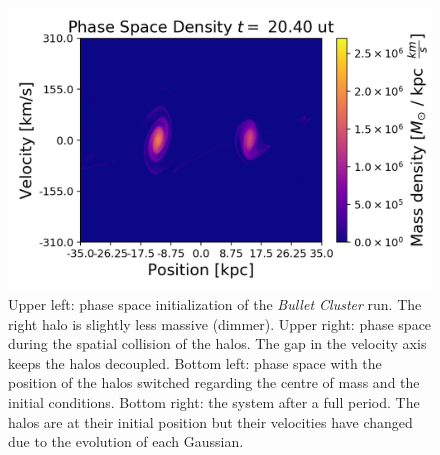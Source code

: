 \begin{figure}[h!]
    \includegraphics[scale=0.45]{imag/bullet51.png}
    \caption{Upper left: phase space initialization of the \emph{Bullet Cluster} run. The right halo is slightly less massive (dimmer). Upper right: phase space during the spatial collision of the halos. The gap in the velocity axis keeps the halos decoupled. Bottom left: phase space with the position of the halos switched regarding the centre of mass and the initial conditions. Bottom right: the system after a full period. The halos are at their initial position but their velocities have changed due to the evolution of each Gaussian.}
    \label{phaseNoColBullet}
\end{figure}


